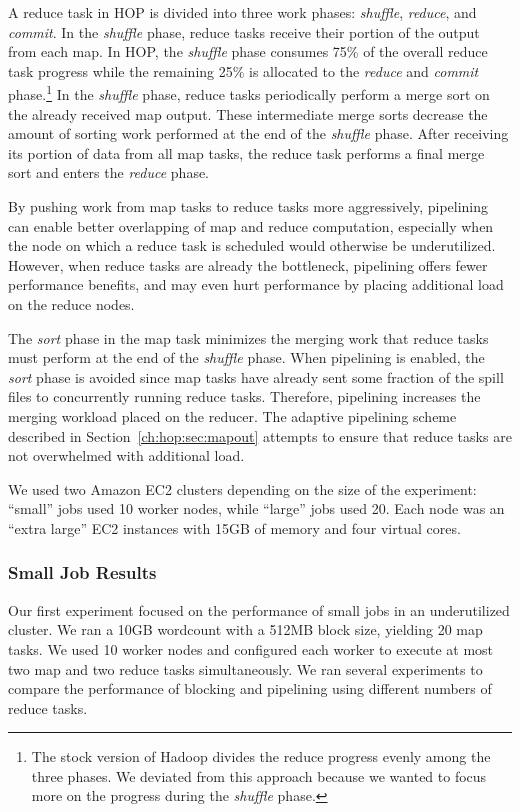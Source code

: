 A reduce task in HOP is divided into three work phases: {\em shuffle}, {\em
  reduce}, and {\em commit}.  In the {\em shuffle} phase, reduce tasks receive
their portion of the output from each map.  In HOP, the {\em shuffle} phase
consumes 75\% of the overall reduce task progress while the remaining 25\% is
allocated to the {\em reduce} and {\em commit} phase.\footnote{The stock version
  of Hadoop divides the reduce progress evenly among the three phases. We
  deviated from this approach because we wanted to focus more on the progress
  during the {\em shuffle} phase.}  In the {\em shuffle} phase, reduce tasks
periodically perform a merge sort on the already received map output. These
intermediate merge sorts decrease the amount of sorting work performed at the
end of the {\em shuffle} phase. After receiving its portion of data from all map
tasks, the reduce task performs a final merge sort and enters the {\em reduce}
phase.

By pushing work from map tasks to reduce tasks more aggressively, pipelining can
enable better overlapping of map and reduce computation, especially when the
node on which a reduce task is scheduled would otherwise be
underutilized. However, when reduce tasks are already the bottleneck, pipelining
offers fewer performance benefits, and may even hurt performance by placing
additional load on the reduce nodes.

The {\em sort} phase in the map task minimizes the merging work that reduce
tasks must perform at the end of the {\em shuffle} phase. When pipelining is
enabled, the {\em sort} phase is avoided since map tasks have already sent some
fraction of the spill files to concurrently running reduce tasks. Therefore,
pipelining increases the merging workload placed on the reducer. The adaptive
pipelining scheme described in Section~\ref{ch:hop:sec:mapout} attempts to ensure that
reduce tasks are not overwhelmed with additional load.

We used two Amazon EC2 clusters depending on the size of the experiment:
``small'' jobs used 10 worker nodes, while ``large'' jobs used 20. Each node
was an ``extra large'' EC2 instances with 15GB of memory and four virtual cores.

\subsubsection{Small Job Results}
Our first experiment focused on the performance of small jobs in an
underutilized cluster. We ran a 10GB wordcount with a 512MB block size, yielding
20 map tasks. We used 10 worker nodes and configured each worker to execute at
most two map and two reduce tasks simultaneously. We ran several experiments to
compare the performance of blocking and pipelining using different numbers of
reduce tasks.

